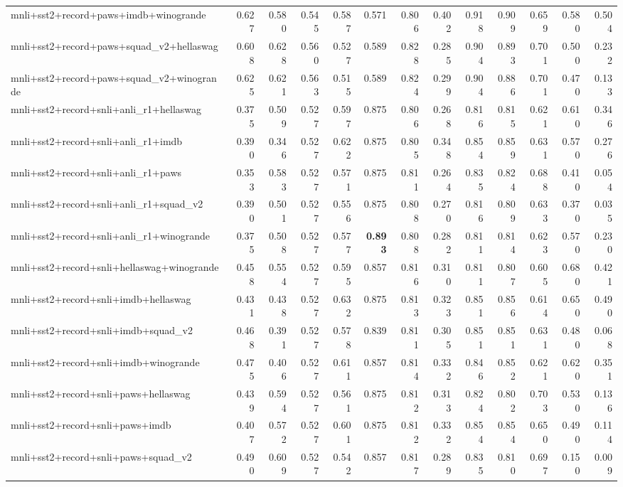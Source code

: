 \begin{table}[t]
\begin{tabular}{lrrrrrrrrrrrr}
    mnli+sst2+record+paws+imdb+winogrande & 0.627 & 0.580 & 0.545 & 0.587 & 0.571 & 0.806 & 0.402 & 0.918 & 0.909 & 0.659 & 0.580 & 0.504 \\
    mnli+sst2+record+paws+squad\_v2+hellaswag & 0.608 & 0.628 & 0.560 & 0.527 & 0.589 & 0.828 & 0.285 & 0.904 & 0.893 & 0.701 & 0.500 & 0.232 \\
    mnli+sst2+record+paws+squad\_v2+winogrande & 0.625 & 0.621 & 0.563 & 0.515 & 0.589 & 0.824 & 0.299 & 0.904 & 0.886 & 0.701 & 0.470 & 0.133 \\
    mnli+sst2+record+snli+anli\_r1+hellaswag & 0.375 & 0.509 & 0.527 & 0.597 & 0.875 & 0.806 & 0.268 & 0.816 & 0.815 & 0.621 & 0.610 & 0.346 \\
    mnli+sst2+record+snli+anli\_r1+imdb & 0.390 & 0.346 & 0.527 & 0.622 & 0.875 & 0.805 & 0.348 & 0.854 & 0.859 & 0.631 & 0.570 & 0.276 \\
    mnli+sst2+record+snli+anli\_r1+paws & 0.353 & 0.583 & 0.527 & 0.571 & 0.875 & 0.811 & 0.264 & 0.835 & 0.824 & 0.688 & 0.410 & 0.054 \\
    mnli+sst2+record+snli+anli\_r1+squad\_v2 & 0.390 & 0.501 & 0.527 & 0.556 & 0.875 & 0.808 & 0.270 & 0.816 & 0.809 & 0.633 & 0.370 & 0.035 \\
    mnli+sst2+record+snli+anli\_r1+winogrande & 0.375 & 0.508 & 0.527 & 0.577 & \textbf{0.893} & 0.808 & 0.282 & 0.811 & 0.814 & 0.623 & 0.570 & 0.230 \\
    mnli+sst2+record+snli+hellaswag+winogrande & 0.458 & 0.554 & 0.527 & 0.595 & 0.857 & 0.816 & 0.310 & 0.811 & 0.807 & 0.605 & 0.680 & 0.421 \\
    mnli+sst2+record+snli+imdb+hellaswag & 0.431 & 0.438 & 0.527 & 0.632 & 0.875 & 0.813 & 0.323 & 0.851 & 0.856 & 0.614 & 0.650 & 0.490 \\
    mnli+sst2+record+snli+imdb+squad\_v2 & 0.468 & 0.391 & 0.527 & 0.578 & 0.839 & 0.811 & 0.305 & 0.851 & 0.851 & 0.631 & 0.480 & 0.068 \\
    mnli+sst2+record+snli+imdb+winogrande & 0.475 & 0.406 & 0.527 & 0.611 & 0.857 & 0.814 & 0.332 & 0.846 & 0.852 & 0.621 & 0.620 & 0.351 \\
    mnli+sst2+record+snli+paws+hellaswag & 0.439 & 0.594 & 0.527 & 0.561 & 0.875 & 0.812 & 0.313 & 0.824 & 0.802 & 0.703 & 0.530 & 0.136 \\
    mnli+sst2+record+snli+paws+imdb & 0.407 & 0.572 & 0.527 & 0.601 & 0.875 & 0.812 & 0.332 & 0.854 & 0.854 & 0.650 & 0.490 & 0.114 \\
    mnli+sst2+record+snli+paws+squad\_v2 & 0.490 & 0.609 & 0.527 & 0.542 & 0.857 & 0.817 & 0.289 & 0.835 & 0.810 & 0.697 & 0.150 & 0.009 \\

\end{tabular}
\end{table}
